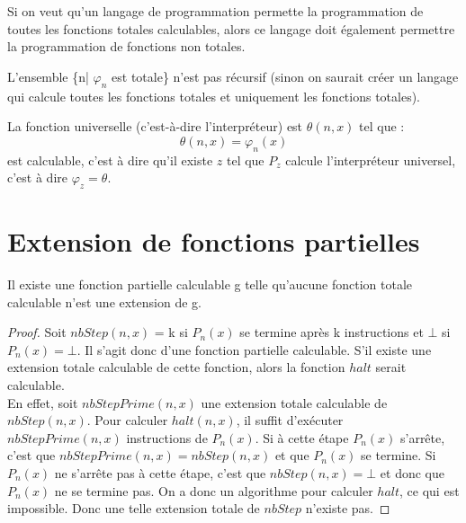 \begin{myprop}
	Si on veut qu'un langage de programmation permette la programmation de toutes les fonctions totales calculables, alors ce langage doit également permettre la programmation de fonctions non totales.
\end{myprop}

\begin{myprop}
	L'ensemble \{n| $\varphi_n$ est totale\} n'est pas récursif
    (sinon on saurait créer un langage qui calcule toutes les fonctions totales et uniquement les fonctions totales).
\end{myprop}

\begin{mytheo}
  \label{theo:fununiv}
	La fonction universelle (c'est-à-dire l'interpréteur) est $\theta(n,x)$ tel que :
	\[ \theta(n,x) = \varphi_n(x) \]
    est calculable, c'est à dire qu'il existe $z$ tel que $P_z$ calcule l'interpréteur universel,
    c'est à dire $\varphi_z = \theta$.
\end{mytheo}


\section{Extension de fonctions partielles}
\label{sec:extension_de_fonctions_partielles}

\begin{mytheo}
	Il existe une fonction partielle calculable g telle qu'aucune fonction totale calculable n'est une extension de g.
  \begin{proof}
    Soit $nbStep(n,x)$  = k si $P_n(x)$ se termine après k instructions et $\bot$ si $P_n(x) = \bot$. Il s'agit donc d'une fonction partielle calculable. S'il existe une extension totale calculable de cette fonction, alors la fonction $halt$ serait calculable.\\
    En effet, soit $nbStepPrime(n,x)$ une extension totale calculable de $nbStep(n,x)$. Pour calculer $halt(n,x)$, il suffit d'exécuter $nbStepPrime(n,x)$ instructions de $P_n(x)$.  Si à cette étape $P_n(x)$ s'arrête, c'est que $nbStepPrime(n,x)=nbStep(n,x)$ et que $P_n(x)$ se termine.  Si $P_n(x)$ ne s'arrête pas à cette étape, c'est que $nbStep(n,x)=\bot$ et donc que $P_n(x)$ ne se termine pas. On a donc un algorithme pour calculer $halt$, ce qui est impossible.  Donc une telle extension totale de $nbStep$ n'existe pas.
  \end{proof}
\end{mytheo}

